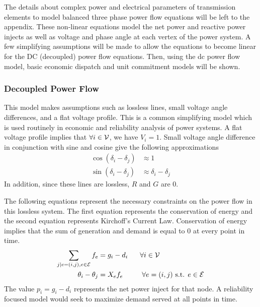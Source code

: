 The details about complex power and electrical parameters of transmission elements to model balanced three phase power flow equations will be left to the appendix.\endnote{} \endnote{}  These non-linear equations model the net power and reactive power injects as well as voltage and phase angle at each vertex of the power system.  A few simplifying assumptions will be made to allow the equations to become linear for the DC (decoupled) power flow equations.  Then, using the dc power flow model, basic economic dispatch and unit commitment models will be shown.  

\subsubsection{Decoupled Power Flow}
This model makes assumptions such as lossless lines, small voltage angle differences, and a flat voltage profile.  This is a common simplifying model which is used routinely in economic and reliability analysis of power systems.  A flat voltage profile implies that $\forall i \in \mathcal{V}$, we have $V_i = 1$.  Small voltage angle difference in conjunction with sine and cosine give the following approximations
\begin{align}
\cos(\delta_i - \delta_j) &\approx 1	\\
\sin(\delta_i-\delta_j) & \approx \delta_i - \delta_j
\end{align}
In addition, since these lines are lossless, $R$ and $G$ are 0.  

The following equations represent the necessary constraints on the power flow in this lossless system.  The first equation represents the conservation of energy and the second equation represents Kirchoff's Current Law.  Conservation of energy implies that the sum of generation and demand is equal to 0 at every point in time.
\begin{align}	\displaystyle
\sum_{j | e=(i,j),  e \in \cE}{f_{e}} &= g_{i} -d_{i} \hspace{17px}   \forall i \in \cV   \label{pf1}
\\
\theta_{i} - \theta_{j} &= X_{e} f_{e}			\hspace{27px}	\forall e=(i,j) \mbox{ s.t. } e \in \cE   \label{pf2}
\end{align}
The value $p_{i} = g_{i} - d_{i}$ represents the net power inject for that node.  A reliability focused model would seek to maximize demand served at all points in time.

